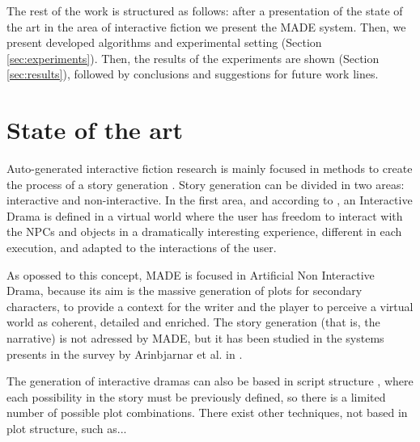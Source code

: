 \documentclass[final,1p,times]{elsarticle}
\begin{document}
The rest of the work is structured as follows: after a presentation of
the state of
the art in  the area of interactive fiction
 we present the MADE system. Then, we present developed algorithms and experimental setting (Section \ref{sec:experiments}). 
Then, the results of the experiments are shown (Section \ref{sec:results}), followed by conclusions and suggestions for future work lines.


%
\section{State of the art}
\label{sec:soa}
%

Auto-generated interactive fiction research is mainly focused in methods to create the process of a story generation \cite{nairat2011character}. Story generation can be divided in two areas: interactive and non-interactive. In the first area, and according to \cite{ReviewArinbjarnar09}, an Interactive Drama is defined in a virtual world where the user has freedom to interact with the NPCs and objects in a dramatically interesting experience, different in each execution, and adapted to the interactions of the user.


As opossed to this concept, MADE is focused in Artificial Non Interactive Drama, because its aim is the massive generation of plots for secondary characters, to provide a context for the writer and the player to perceive a virtual world as coherent, detailed and enriched. The story generation (that is, the narrative) is not adressed by MADE, but it has been studied in the systems presents in the survey by Arinbjarnar et al. in \cite{ReviewArinbjarnar09}.


The generation of interactive dramas can also be based in script
structure \cite{ArchitectureYoung04}, where each possibility in the
story must be previously defined, so there is a limited number of
possible plot combinations. There exist other techniques, not based in
plot structure, such as... %
\end{document}
